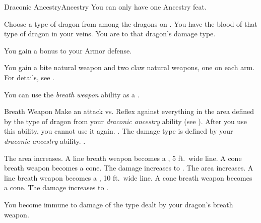     \begin{feat}{Draconic Ancestry}{Ancestry}
         You can only have one Ancestry feat.

         Choose a type of dragon from among the dragons on .
        You have the blood of that type of dragon in your veins.
        You are  to that dragon's damage type.

         You gain a  bonus to your Armor defense.

         You gain a bite natural weapon and two claw natural weapons, one on each arm.
        For details, see .

         You can use the \textit{breath weapon} ability as a .
        \begin{activeability}{Breath Weapon}
            \rankline
            Make an attack vs. Reflex against everything in the area defined by the type of dragon from your \textit{draconic ancestry} ability (see ).
            After you use this ability, you  cannot use it again.
            \hit \damagerankthree{}.
            The damage type is defined by your \textit{draconic ancestry} ability.
            \miss {}.

            \rankline
             The area increases.
                A line breath weapon becomes a \arealarge, 5 ft.\ wide line.
                A cone breath weapon becomes a \areamed cone.
             The damage increases to \damagerankfive{}.
             The area increases.
                A line breath weapon becomes a \areahuge, 10 ft.\ wide line.
                A cone breath weapon becomes a \arealarge cone.
             The damage increases to \damagerankseven{}.
        \end{activeability}

         You become immune to damage of the type dealt by your dragon's breath weapon.


\end{feat}
